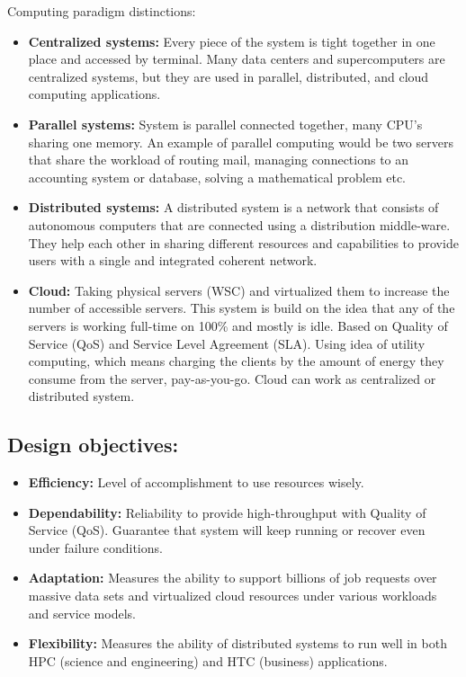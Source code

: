 \documentclass[12pt]{report}
\begin{document}
Computing paradigm distinctions:
\begin{itemize}
\item \textbf{Centralized systems:}
        Every piece of the system is tight together in one place and accessed by terminal. Many data centers and supercomputers are
centralized systems, but they are used in parallel, distributed, and cloud computing applications.
\item \textbf{Parallel systems:}
        System is parallel connected together, many CPU's sharing one memory. An example of parallel computing would be two servers that share the workload of routing mail, managing connections to an accounting system or database, solving a mathematical problem etc.
\item \textbf{Distributed systems:}
        A distributed system is a network that consists of autonomous computers that are connected using a distribution middle-ware. They help each other in sharing different resources and capabilities to provide users with a single and integrated coherent network.
\item \textbf{Cloud:}
        Taking physical servers (WSC) and virtualized them to increase the number of accessible servers. This system is build on the idea that any of the servers is working full-time on 100\% and mostly is idle. Based on Quality of Service (QoS) and Service Level Agreement (SLA).
        Using idea of utility computing, which means charging the clients by the amount of energy they consume from the server, pay-as-you-go.
        Cloud can work as centralized or distributed system.
\end{itemize}

\subsection{Design objectives:}
\begin{itemize}
\item \textbf{Efficiency:}
	Level of accomplishment to use resources wisely.
\item \textbf{Dependability:}
	Reliability to provide high-throughput with Quality of Service (QoS). Guarantee that system will keep running or recover even under failure conditions.
\item \textbf{Adaptation:}
	Measures the ability to support billions of job requests
over massive data sets and virtualized cloud resources under various workloads and service
models.
\item \textbf{Flexibility:}
Measures the ability of distributed systems to run well in
both HPC (science and engineering) and HTC (business) applications.
\end{itemize}
\end{document}
